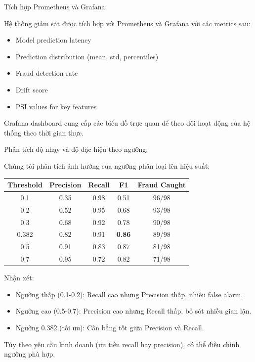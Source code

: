 Tích hợp Prometheus và Grafana:

Hệ thống giám sát được tích hợp với Prometheus và Grafana với các metrics sau:
\begin{itemize}
    \item Model prediction latency
    \item Prediction distribution (mean, std, percentiles)
    \item Fraud detection rate
    \item Drift score
    \item PSI values for key features
\end{itemize}

Grafana dashboard cung cấp các biểu đồ trực quan để theo dõi hoạt động của hệ thống theo thời gian thực.

Phân tích độ nhạy và độ đặc hiệu theo ngưỡng:

Chúng tôi phân tích ảnh hưởng của ngưỡng phân loại lên hiệu suất:

\begin{center}
\begin{tabular}{c|c|c|c|c}
    \textbf{Threshold} & \textbf{Precision} & \textbf{Recall} & \textbf{F1} & \textbf{Fraud Caught} \\
    \hline
    0.1 & 0.35 & 0.98 & 0.51 & 96/98 \\
    0.2 & 0.52 & 0.95 & 0.68 & 93/98 \\
    0.3 & 0.68 & 0.92 & 0.78 & 90/98 \\
    0.382 & 0.82 & 0.91 & \textbf{0.86} & 89/98 \\
    0.5 & 0.91 & 0.83 & 0.87 & 81/98 \\
    0.7 & 0.95 & 0.72 & 0.82 & 71/98 \\
\end{tabular}
\end{center}

Nhận xét:
\begin{itemize}
    \item Ngưỡng thấp (0.1-0.2): Recall cao nhưng Precision thấp, nhiều false alarm.
    \item Ngưỡng cao (0.5-0.7): Precision cao nhưng Recall thấp, bỏ sót nhiều gian lận.
    \item Ngưỡng 0.382 (tối ưu): Cân bằng tốt giữa Precision và Recall.
\end{itemize}

Tùy theo yêu cầu kinh doanh (ưu tiên recall hay precision), có thể điều chỉnh ngưỡng phù hợp.

